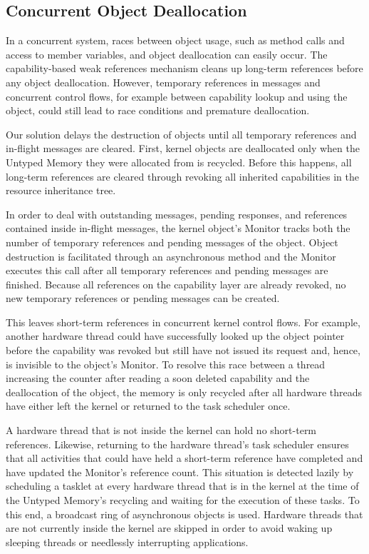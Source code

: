 \subsection{Concurrent Object Deallocation}
\label{sec:async-deletion-dyn}

In a concurrent system, races between object usage, such as method calls and access to member variables, and object deallocation can easily occur.
The capability-based weak references mechanism cleans up long-term references before any object deallocation. However, temporary references in messages and concurrent control flows, for example between capability lookup and using the object, could still lead to race conditions and premature deallocation.

Our solution delays the destruction of objects until all temporary references and in-flight messages are cleared. First, kernel objects are deallocated only when the Untyped Memory they were allocated from is recycled. Before this happens, all long-term references are cleared through revoking all inherited capabilities in the resource inheritance tree.

In order to deal with outstanding messages, pending responses, and references contained inside in-flight messages, the kernel object's Monitor
tracks both the number of temporary references and pending messages of the object. Object destruction is facilitated through an asynchronous method and the Monitor executes this call after all temporary references and pending messages are finished. Because all references on the capability layer are already revoked, no new temporary references or pending messages can be created.

This leaves short-term references in concurrent kernel control flows. For example, another hardware thread could have successfully looked up the object pointer before the capability was revoked but still have not issued its request and, hence, is invisible to the object's Monitor. To resolve this race between a thread increasing the counter after reading a soon deleted capability and the deallocation of the object, the memory is only recycled after all hardware threads have either left the kernel or returned to the task scheduler once.

A hardware thread that is not inside the kernel can hold no short-term references. Likewise, returning to the hardware thread's task scheduler ensures that all activities that could have held a short-term reference have completed and have updated the Monitor's reference count. This situation is detected lazily by scheduling a tasklet at every hardware thread that is in the kernel at the time of the Untyped Memory's recycling and waiting for the execution of these tasks. To this end, a broadcast ring of asynchronous objects is used. Hardware threads that are not currently inside the kernel are skipped in order to avoid waking up sleeping threads or needlessly interrupting applications.


